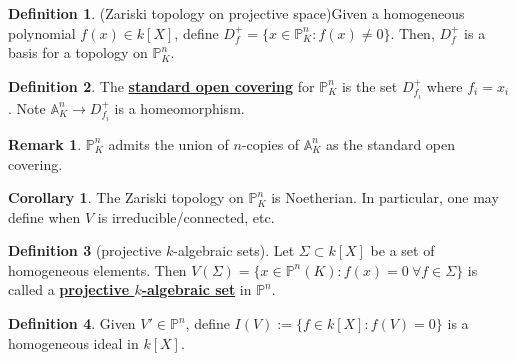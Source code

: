 \documentclass{article}
\theoremstyle{definition}
\theoremstyle{definition}
\newtheorem{definition}{Definition}[theorem]
\theoremstyle{definition}
\newtheorem{remark}{Remark}[theorem]
\theoremstyle{definition}
\theoremstyle{definition}
\theoremstyle{definition}
\newtheorem{corollary}{Corollary}[theorem]
\theoremstyle{definition}
\begin{document}
\begin{tcolorbox}[colback=purple!5!white,colframe=purple!75!black]
\begin{definition}
(Zariski topology on projective space)Given a homogeneous polynomial $f(x)\in k[X]$, define $D_f^+=\{ x\in \mathbb{P}^n_K:f(x)\neq 0 \}$. Then, $D_f^+$ is a basis for a topology on $\mathbb{P}^n_K$. 
\end{definition}
\end{tcolorbox}


\begin{tcolorbox}[colback=purple!5!white,colframe=purple!75!black]
\begin{definition}
The \underline{\textbf{standard open covering}} for $\mathbb{P}^n_K$ is the set $D_{f_i}^+$ where $f_i=x_i$. Note $\mathbb{A}^n_K\to D_{f_i}^+$ is a homeomorphism.
\end{definition}
\end{tcolorbox}


\begin{tcolorbox}[colback=green!5!white,colframe=green!30!white]
\begin{remark}
$\mathbb{P}^n_K$ admits the union of $n$-copies of $\mathbb{A}^n_K$ as the standard open covering. 
\end{remark}
\end{tcolorbox}


\begin{tcolorbox}[colback=green!5!white,colframe=green!30!white]
\begin{corollary}
The Zariski topology on $\mathbb{P}^n_K$ is Noetherian. In particular, one may define when $V$ is irreducible/connected, etc. 
\end{corollary}
\end{tcolorbox}


\begin{tcolorbox}[colback=purple!5!white,colframe=purple!75!black]
\begin{definition}[projective $k$-algebraic sets]
Let $\Sigma\subset k[X]$ be a set of homogeneous elements. Then $V(\Sigma)=\{ x\in \mathbb{P}^n(K): f(x)=0 \ \forall f\in \Sigma \}$ is called a \underline{\textbf{projective $k$-algebraic set}} in $\mathbb{P}^n$. 
\end{definition}
\end{tcolorbox}


\begin{tcolorbox}[colback=purple!5!white,colframe=purple!75!black]
\begin{definition}
Given $V'\in \mathbb{P}^n$, define $I(V):=\{ f\in k[X]:f(V)=0 \}$ is a homogeneous ideal in $k[X]$. 
\end{definition}
\end{tcolorbox}
\end{document}
